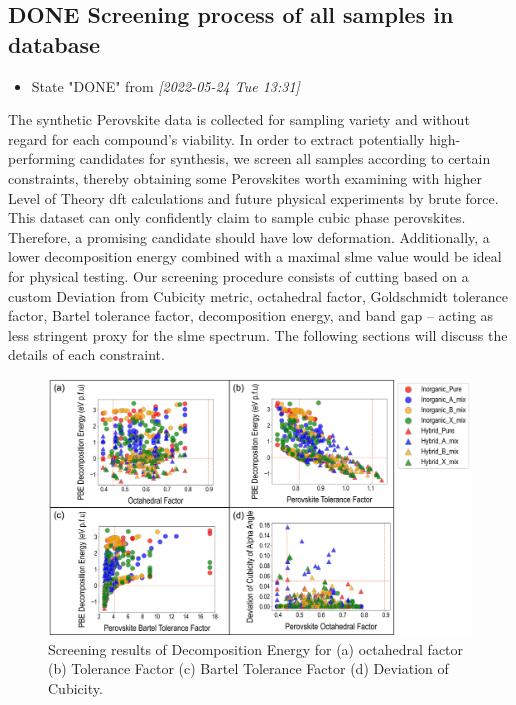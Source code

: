 \documentclass[twoside, twocolumn, 9pt, draft]{article}
\begin{document}
\subsection*{{\bfseries\sffamily DONE} Screening process of all samples in database}
\label{sec:org5953ef3}
\begin{itemize}
\item State "DONE"       from              \textit{[2022-05-24 Tue 13:31]}
\end{itemize}
The synthetic Perovskite data is collected for sampling variety and
without regard for each compound's viability. In order to extract
potentially high-performing candidates for synthesis, we screen all
samples according to certain constraints, thereby obtaining some
Perovskites worth examining with higher Level of Theory
\acrshort{dft} calculations and future physical experiments by
brute force. This dataset can only confidently claim to sample cubic
phase perovskites. Therefore, a promising candidate should have low
deformation. Additionally, a lower decomposition energy combined with
a maximal \gls{slme} value would be ideal for physical
testing. Our screening procedure consists of cutting based on a custom
Deviation from Cubicity metric, octahedral factor, Goldschmidt
tolerance factor, Bartel tolerance factor, decomposition energy, and
band gap -- acting as less stringent proxy for the \gls{slme}
spectrum. The following sections will discuss the details of each
constraint.

\begin{figure}
\centering
\includegraphics[width=.9\linewidth]{screening_factor.png}
\caption{\label{fig:cuts} Screening results of Decomposition Energy for (a) octahedral factor (b) Tolerance Factor (c) Bartel Tolerance Factor (d) Deviation of Cubicity.}
\end{figure}
\end{document}

